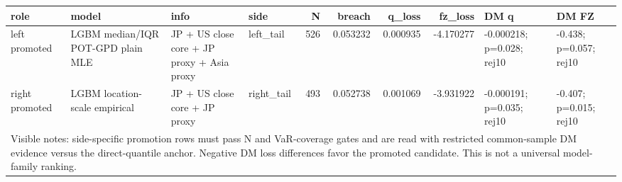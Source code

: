 \begin{tabular}{lll lrrrrll}
\toprule
role & model & info & side & N & breach & q_loss & fz_loss & DM q & DM FZ \\
\midrule
left promoted & LGBM median/IQR POT-GPD plain MLE & JP + US close core + JP proxy + Asia proxy & left\_tail & 526 & 0.053232 & 0.000935 & -4.170277 & -0.000218; p=0.028; rej10 & -0.438; p=0.057; rej10 \\
right promoted & LGBM location-scale empirical & JP + US close core + JP proxy & right\_tail & 493 & 0.052738 & 0.001069 & -3.931922 & -0.000191; p=0.035; rej10 & -0.407; p=0.015; rej10 \\
\midrule
\multicolumn{10}{l}{\footnotesize Visible notes: side-specific promotion rows must pass N and VaR-coverage gates and are read with restricted common-sample DM evidence versus the direct-quantile anchor. Negative DM loss differences favor the promoted candidate. This is not a universal model-family ranking.} \\
\bottomrule
\end{tabular}
